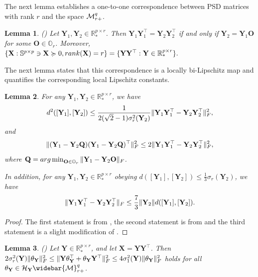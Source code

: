 \documentclass[11pt]{article}
\newtheorem{Lemma}{Lemma}
\newcommand{\bbR}{\mathbb{R}}
\newcommand{\bbS}{\mathbb{S}}
\newcommand{\cH}{\mathcal{H}}
\newcommand{\0}{{\mathbf{0}}}
\newcommand{\1}{{\mathbf{1}}}
\newcommand{\X}{{\mathbf{X}}}
\renewcommand{\O}{{\mathbf{O}}}
\newcommand{\Q}{{\mathbf{Q}}}
\newcommand{\Y}{{\mathbf{Y}}}
\newcommand{\cM}{{\cal M}}
\newcommand{\rank}{{\rm rank}}
\newcommand{\F}{{\rm F}}
\newcommand{\argmin}{\mathop{\rm arg\min}}
\newcommand{\bbO}{\mathbb{O}}
\newcommand{\nc}{\normalcolor}
\begin{document}
The next lemma establishes a one-to-one correspondence between PSD matrices with rank $r$ and the space $\cM_{r+}^q$.

\begin{Lemma}(\cite[Proposition A.1]{massart2020quotient}) \label{lm: completeness-quotient-PSD} \nc Let $\Y_1, \Y_2 \in \bbR_*^{p \times r}$. Then $\Y_1 \Y_1^\top = \Y_2 \Y_2^\top$ if and only if $\Y_2 = \Y_1 \O$ for some $\O \in \bbO_r$. Moreover, $\{\X:\bbS^{p \times p} \ni \X \succcurlyeq 0, \rank(\X) = r \} = \{\Y \Y^\top: \Y \in \bbR^{p \times r}_* \}.$
\end{Lemma}

\nc




The next lemma states that this correspondence is a locally bi-Lipschitz map and quantifies the corresponding local Lipschitz constants. 
\nc 
\begin{Lemma} \label{lm: distUY-UUYY-transfer}
	For any $\Y_1, \Y_2 \in \bbR^{p \times r}_*$, we have
	\begin{equation} \label{ineq: distUY-UUYY-transfer-1}
		d^2([\Y_1], [\Y_2]) \leq \frac{1}{2(\sqrt{2}-1) \sigma^2_r(\Y_2) } \|\Y_1 \Y_1^\top - \Y_2 \Y_2^\top \|_\F^2,
	\end{equation}
	and 
	\begin{equation}\label{ineq: distUY-UUYY-transfer-2}
		\|(\Y_1 - \Y_2 \Q) (\Y_1 - \Y_2 \Q)^\top\|_\F^2 \leq 2\|\Y_1 \Y_1^\top - \Y_2 \Y_2^\top \|_\F^2,
	\end{equation}
	where $\Q = \argmin_{\O \in \bbO_r}  \|\Y_1 - \Y_2 \O\|_\F$.
	
	In addition, for any $\Y_1, \Y_2 \in \bbR^{p \times r}_*$ \nc obeying $d([\Y_1],[\Y_2]) \leq \frac{1}{3} \sigma_r(\Y_2)$, we have
	\begin{equation}\label{ineq: distUY-UUYY-transfer-3}
		\|\Y_1 \Y_1^\top - \Y_2 \Y_2^\top \|_\F \leq \frac{7}{3} \|\Y_2 \| d([\Y_1], [\Y_2]).
	\end{equation}
\end{Lemma}
\begin{proof}
	The first statement is from \cite[Lemma 5.4]{tu2016low}, the second statement is from \cite[Lemma 6]{ge2017no} and the third statement is a slight modification of \cite[Lemma 5.3]{tu2016low}.
\end{proof}


\begin{Lemma}(\cite[Proposition 2]{luo2021geometric}) \label{lm: norm-bound-Ytheta-thetaY} Let $\Y \in \bbR^{p \times r}_*$, and let $\X = \Y \Y^\top$. Then $2 \sigma^2_r(\Y) \|\theta_\Y\|_\F^2 \leq \|\Y \theta_\Y^\top + \theta_\Y \Y^\top \|_\F^2 \leq 4 \sigma^2_1(\Y) \|\theta_\Y\|_\F^2$ holds for all $\theta_\Y \in \cH_\Y \widebar{\cM}_{r+}^{q}$.
\end{Lemma}
\end{document}
